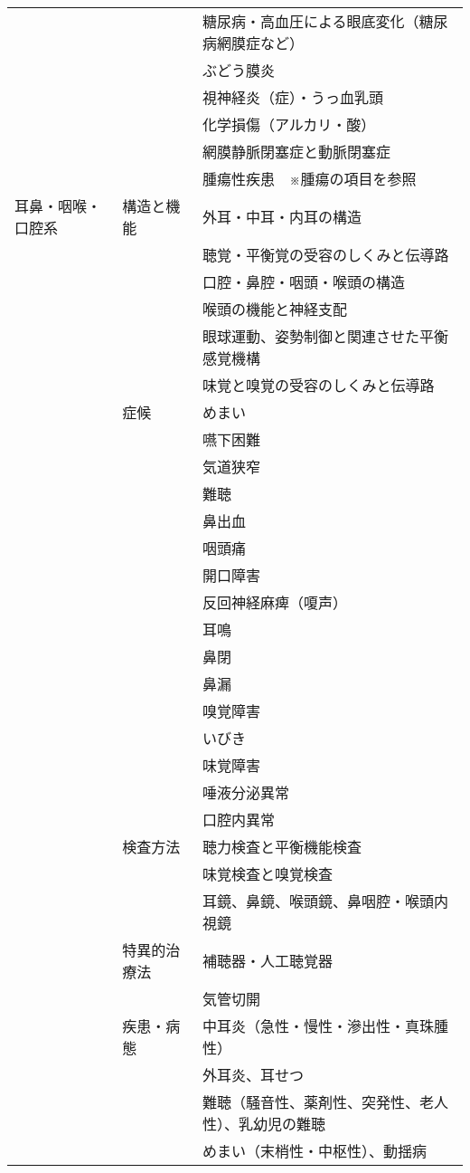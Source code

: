 \begin{xltabular}{\linewidth}{XXX}
 &  & 糖尿病・高血圧による眼底変化（糖尿病網膜症など） \\
 &  & ぶどう膜炎 \\
 &  & 視神経炎（症）・うっ血乳頭 \\
 &  & 化学損傷（アルカリ・酸） \\
 &  & 網膜静脈閉塞症と動脈閉塞症 \\
 &  & 腫瘍性疾患　※腫瘍の項目を参照 \\
耳鼻・咽喉・口腔系 & 構造と機能 & 外耳・中耳・内耳の構造 \\
 &  & 聴覚・平衡覚の受容のしくみと伝導路 \\
 &  & 口腔・鼻腔・咽頭・喉頭の構造 \\
 &  & 喉頭の機能と神経支配 \\
 &  & 眼球運動、姿勢制御と関連させた平衡感覚機構 \\
 &  & 味覚と嗅覚の受容のしくみと伝導路 \\
 & 症候 & めまい \\
 &  & 嚥下困難 \\
 &  & 気道狭窄 \\
 &  & 難聴 \\
 &  & 鼻出血 \\
 &  & 咽頭痛 \\
 &  & 開口障害 \\
 &  & 反回神経麻痺（嗄声） \\
 &  & 耳鳴 \\
 &  & 鼻閉 \\
 &  & 鼻漏 \\
 &  & 嗅覚障害 \\
 &  & いびき \\
 &  & 味覚障害 \\
 &  & 唾液分泌異常 \\
 &  & 口腔内異常 \\
 & 検査方法 & 聴力検査と平衡機能検査 \\
 &  & 味覚検査と嗅覚検査 \\
 &  & 耳鏡、鼻鏡、喉頭鏡、鼻咽腔・喉頭内視鏡 \\
 & 特異的治療法 & 補聴器・人工聴覚器 \\
 &  & 気管切開 \\
 & 疾患・病態 & 中耳炎（急性・慢性・滲出性・真珠腫性） \\
 &  & 外耳炎、耳せつ \\
 &  & 難聴（騒音性、薬剤性、突発性、老人性）、乳幼児の難聴 \\
 &  & めまい（末梢性・中枢性）、動揺病 \\

\end{xltabular}
